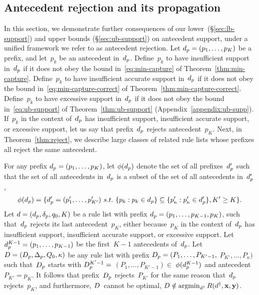 \begin{arxiv}
\subsection{Antecedent rejection and its propagation}
\label{sec:reject}

In this section, we demonstrate further consequences of
our lower~(\S\ref{sec:lb-support}) and upper
bounds (\S\ref{sec:ub-support}) on antecedent support,
under a unified framework we refer to as antecedent rejection.
%
Let ${d_p = (p_1, \dots, p_K)}$ be a prefix,
and let~$p_k$ be an antecedent in~$d_p$.
%
Define~$p_k$ to have insufficient support in~$d_p$
if it does not obey the bound in~\eqref{eq:min-capture}
of Theorem~\ref{thm:min-capture}.
%
Define~$p_k$ to have insufficient accurate support in~$d_p$
if it does not obey the bound in~\eqref{eq:min-capture-correct}
of Theorem~\ref{thm:min-capture-correct}.
%
Define~$p_k$ to have excessive support in~$d_p$
if it does not obey the bound in~\eqref{eq:ub-support}
of Theorem~\ref{thm:ub-support} (Appendix~\ref{appendix:ub-supp}).
%
If~$p_k$ in the context of~$d_p$ has insufficient support,
insufficient accurate support, or excessive support,
let us say that prefix~$d_p$ rejects antecedent~$p_K$.
%
Next, in Theorem~\ref{thm:reject}, we describe large classes of
related rule lists whose prefixes all reject the same antecedent.

\begin{theorem}
\label{thm:reject}
For any prefix ${d_p = (p_1, \dots, p_K)}$,
let $\phi(d_p)$ denote the set of all
prefixes~$d_p'$ such that
the set of all antecedents in~$d_p$ is a subset of
the set of all antecedents in~$d_p'$, \ie
\begin{align}
\phi(d_p) =
\{d_p' = (p'_1, \dots, p'_{K'})
~s.t.~ \{p_k : p_k \in d_p \} \subseteq
\{p'_\kappa : p'_\kappa \in d_p'\}, K' \ge K \}.
\label{eq:start-contains}
\end{align}
%
Let ${{d} = (d_p, \delta_p, q_0, K)}$ be a rule list
with prefix ${d_p = (p_1, \dots, p_{K-1}, p_{K})}$,
such that~$d_p$ rejects its last antecedent~$p_{K}$,
either because~$p_{K}$ in the context of~$d_p$ has
insufficient support, insufficient accurate support,
or excessive support.
%
Let ${d_p^{K-1} = (p_1, \dots, p_{K-1})}$ be the
first~${K - 1}$ antecedents of~$d_p$.
%
Let ${{D} = (D_p, \Delta_p, Q_0, \kappa)}$
be any rule list with prefix
${D_p = (P_1, \dots, P_{K'-1},}$ ${P_{K'}, \dots, P_{\kappa})}$
such that~$D_p$ starts with ${D_p^{K'-1} =}$
${(P_1, \dots, P_{K'-1}) \in}$ ${\phi(d_p^{K-1})}$
and antecedent ${P_{K'} = p_{K}}$.
%
It follows that prefix~$D_p$ rejects~$P_{K'}$
for the same reason that~$d_p$ rejects~$p_{K}$,
and furthermore, ${D}$~cannot be optimal, \ie
${{D} \notin \operatorname*{argmin}_{{d}^\dagger} R({d}^\dagger, \mathbf{x}, \mathbf{y})}$.
\end{theorem}


\end{arxiv}
